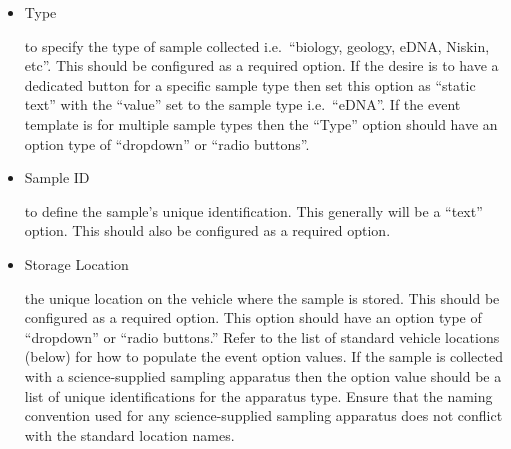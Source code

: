 \documentclass[
  letterpaper,
  DIV=11,
  numbers=noendperiod]{scrreprt}
\begin{document}
\begin{itemize}
\item
  Type

  to specify the type of sample collected i.e.~``biology, geology, eDNA,
  Niskin, etc''. This should be configured as a required option. If the
  desire is to have a dedicated button for a specific sample type then
  set this option as ``static text'' with the ``value'' set to the
  sample type i.e.~``eDNA''. If the event template is for multiple
  sample types then the ``Type'' option should have an option type of
  ``dropdown'' or ``radio buttons''.
\item
  Sample ID

  to define the sample's unique identification. This generally will be a
  ``text'' option. This should also be configured as a required option.
\item
  Storage Location

  the unique location on the vehicle where the sample is stored. This
  should be configured as a required option. This option should have an
  option type of ``dropdown'' or ``radio buttons.'' Refer to the list of
  standard vehicle locations (below) for how to populate the event
  option values. If the sample is collected with a science-supplied
  sampling apparatus then the option value should be a list of unique
  identifications for the apparatus type. Ensure that the naming
  convention used for any science-supplied sampling apparatus does not
  conflict with the standard location names.
\end{itemize}
\end{document}
